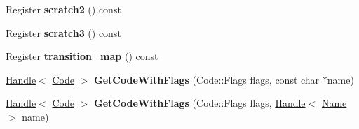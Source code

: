 \begin{DoxyCompactItemize}
\item 
\hypertarget{classv8_1_1internal_1_1_b_a_s_e___e_m_b_e_d_d_e_d_a0042d62c61596277d9d25b856cc3270a}{}Register {\bfseries scratch2} () const \label{classv8_1_1internal_1_1_b_a_s_e___e_m_b_e_d_d_e_d_a0042d62c61596277d9d25b856cc3270a}

\item 
\hypertarget{classv8_1_1internal_1_1_b_a_s_e___e_m_b_e_d_d_e_d_a190105a6d2d1472f7d915a52293e7088}{}Register {\bfseries scratch3} () const \label{classv8_1_1internal_1_1_b_a_s_e___e_m_b_e_d_d_e_d_a190105a6d2d1472f7d915a52293e7088}

\item 
\hypertarget{classv8_1_1internal_1_1_b_a_s_e___e_m_b_e_d_d_e_d_a13889fd845bbe90f26b411509fcc05f8}{}Register {\bfseries transition\+\_\+map} () const \label{classv8_1_1internal_1_1_b_a_s_e___e_m_b_e_d_d_e_d_a13889fd845bbe90f26b411509fcc05f8}

\item 
\hypertarget{classv8_1_1internal_1_1_b_a_s_e___e_m_b_e_d_d_e_d_a080774130a4664613a52ebd17275994c}{}\hyperlink{classv8_1_1internal_1_1_handle}{Handle}$<$ \hyperlink{classv8_1_1internal_1_1_code}{Code} $>$ {\bfseries Get\+Code\+With\+Flags} (Code\+::\+Flags flags, const char $\ast$name)\label{classv8_1_1internal_1_1_b_a_s_e___e_m_b_e_d_d_e_d_a080774130a4664613a52ebd17275994c}

\item 
\hypertarget{classv8_1_1internal_1_1_b_a_s_e___e_m_b_e_d_d_e_d_a312d1f5d621035fab70bfc0bb42c18d8}{}\hyperlink{classv8_1_1internal_1_1_handle}{Handle}$<$ \hyperlink{classv8_1_1internal_1_1_code}{Code} $>$ {\bfseries Get\+Code\+With\+Flags} (Code\+::\+Flags flags, \hyperlink{classv8_1_1internal_1_1_handle}{Handle}$<$ \hyperlink{classv8_1_1internal_1_1_name}{Name} $>$ name)\label{classv8_1_1internal_1_1_b_a_s_e___e_m_b_e_d_d_e_d_a312d1f5d621035fab70bfc0bb42c18d8}

\end{DoxyCompactItemize}
